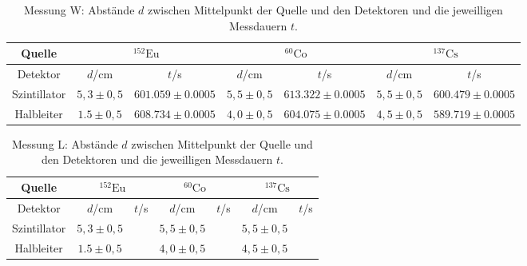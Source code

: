 \documentclass[ngerman,11pt]{article}
\begin{document}
\begin{multicols}{2}
	 






























	\end{multicols}
\begin{table}
	\centering
	\begin{tabular}{|c|c|c|c|c|c|c|}
		\hline
		Quelle & \multicolumn{2}{|c|}{$^{152}\mathrm{Eu}$}&\multicolumn{2}{|c|}{$^{60}\mathrm{Co}$}&\multicolumn{2}{|c|}{$^{137}\mathrm{Cs}$}\\ \hline
		Detektor& $d$/cm & $t$/s& $d$/cm & $t$/s& $d$/cm & $t$/s\\ \hline
		Szintillator & $5,3\pm0,5$ & $601.059 \pm0.0005$ & $5,5\pm 0,5$ & $613.322\pm0.0005$ & $5,5\pm0,5$ & $600.479 \pm0.0005$\\ \hline
		Halbleiter & $1.5\pm0,5$ & $608.734\pm 0.0005$ & $4,0\pm 0,5$ & $604.075\pm 0.0005$ & $4,5\pm0,5$ &$589.719 \pm 0.0005$ \\ \hline
	\end{tabular}
	\caption{Messung W: Abst\"ande $d$ zwischen Mittelpunkt der Quelle und den Detektoren und die  jeweilligen Messdauern $t$.}
\end{table}
\begin{table}
	\centering
	\begin{tabular}{|c|c|c|c|c|c|c|}
		\hline
		Quelle & \multicolumn{2}{|c|}{$^{152}\mathrm{Eu}$}&\multicolumn{2}{|c|}{$^{60}\mathrm{Co}$}&\multicolumn{2}{|c|}{$^{137}\mathrm{Cs}$}\\ \hline
		Detektor& $d$/cm & $t$/s& $d$/cm & $t$/s& $d$/cm & $t$/s\\ \hline
		Szintillator & $5,3\pm0,5$ & & $5,5\pm 0,5$ & & $5,5\pm0,5$ & \\ \hline
		Halbleiter & $1.5\pm0,5$ & & $4,0\pm 0,5$ & & $4,5\pm0,5$ & \\ \hline
	\end{tabular}
	\caption{Messung L: Abst\"ande $d$ zwischen Mittelpunkt der Quelle und den Detektoren und die jeweilligen Messdauern $t$.}
\end{table}
\end{document}
